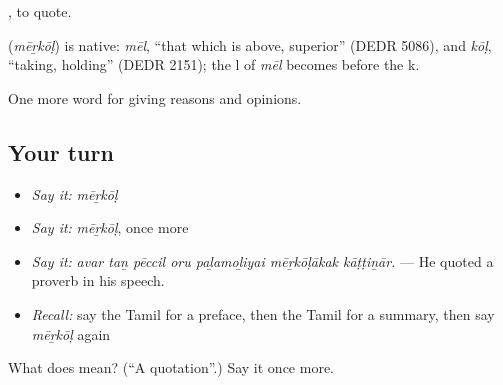  , to quote.

\begin{cousinweb}
\textbf{} (\emph{mēṟkōḷ}) is native: \emph{mēl}, \textquotedblleft{}that which is above, superior\textquotedblright{} (DEDR 5086), and \emph{kōḷ}, \textquotedblleft{}taking, holding\textquotedblright{} (DEDR 2151); the l of \emph{mēl} becomes  before the k.
\end{cousinweb}

\begin{grammarlens}[title={What you've built}]
One more word for giving reasons and opinions.
\end{grammarlens}

\subsection*{Your turn}
\begin{itemize}
\raggedright
  \item \emph{Say it:} \emph{mēṟkōḷ}
  \item \emph{Say it:} \emph{mēṟkōḷ}, once more
  \item \emph{Say it:} \emph{avar taṉ pēccil oru paḻamoḻiyai mēṟkōḷākak kāṭṭiṉār.} — He quoted a proverb in his speech.
  \item \emph{Recall:} say the Tamil for a preface, then the Tamil for a summary, then say \emph{mēṟkōḷ} again
\end{itemize}

\begin{tcolorbox}[breakable,colback=teal!4,colframe=teal!35!black,title={Before you move on}]
What does  mean? (\textquotedblleft{}A quotation\textquotedblright{}.) Say it once more.
\end{tcolorbox}
